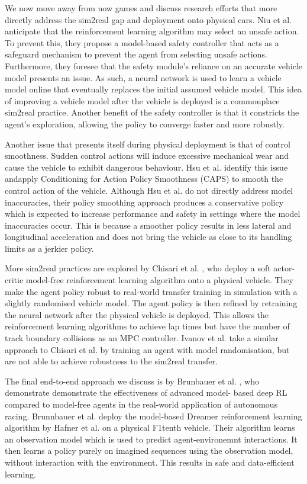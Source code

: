 We now move away from now games and discuss research efforts that more directly address the sim2real gap and deployment onto physical cars.
Niu et al. \cite{Niu2020} anticipate that the reinforcement learning algorithm may select an unsafe action.
To prevent this, they propose a model-based safety controller that acts as a safeguard mechanism to prevent the agent from selecting unsafe actions.
Furthermore, they foresee that the safety module's reliance on an accurate vehicle model presents an issue. 
As such, a neural network is used to learn a vehicle model online that eventually replaces the initial assumed vehicle model.
This idea of improving a vehicle model after the vehicle is deployed is a commonplace sim2real practice.
Another benefit of the safety controller is that it constricts the agent's exploration, allowing the policy to converge faster and more robustly.


Another issue that presents itself during physical deployment is that of control smoothness. 
Sudden control actions will induce excessive mechanical wear and cause the vehicle to exhibit dangerous behaviour.
Hsu et al. \cite{hsu2022} identify this issue andapply Conditioning for Action Policy Smoothness (CAPS) to smooth the control action of the vehicle.
Although Hsu et al. \cite{hsu2022} do not directly address model inaccuracies, their policy smoothing approach produces a conservative policy which is expected to increase performance and safety in settings where the model inaccuracies occur.
This is because a smoother policy results in less lateral and longitudinal acceleration and does not bring the vehicle as close to its handling limits as a jerkier policy.


More sim2real practices are explored by Chisari et al. \cite{Chisari2021}, who deploy a soft actor-critic model-free reinforcement learning algorithm onto a physical vehicle.
They make the agent policy robust to real-world transfer training in simulation with a slightly randomised vehicle model.
The agent policy is then refined by retraining the neural network after the physical vehicle is deployed.
This allows the reinforcement learning algorithms to achieve lap times but have the number of track boundary collisions as an MPC controller.
Ivanov et al. \cite{Ivanov2020} take a similar approach to Chisari et al. \cite{Chisari2021} by training an agent with model randomisation, but are not able to achieve robustness to the sim2real transfer.


The final end-to-end approach we discuss is by Brunbauer et al. \cite{brunnbauer}, who demonstrate demonstrate the effectiveness of advanced model- based deep RL compared to model-free agents in the real-world application of autonomous racing.
Brunnbauer et al. \cite{brunnbauer} deploy the model-based Dreamer reinforcement learning algorithm by Hafner et al. \cite{Hafner2019a} on a physical F1tenth vehicle.
Their algorithm learns an observation model which is used to predict agent-environemnt interactions.
It then learns a policy purely on imagined sequences using the observation model, without interaction with the environment.
This results in safe and data-efficient learning.

